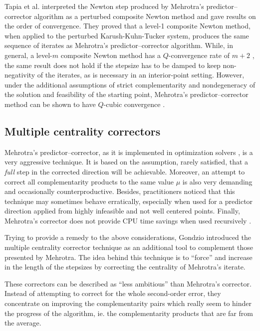 Tapia et al. \cite{TapiaZhangSaltzmanWeiser} interpreted the Newton step 
produced by Mehrotra's predictor--corrector algorithm as a perturbed
composite Newton method and gave results on the order of convergence. 
They proved that a level-1 composite Newton method, when applied 
to the perturbed Karush-Kuhn-Tucker system, produces the same 
sequence of iterates as Mehrotra's predictor--corrector algorithm. 
While, in general, a level-$m$ composite Newton method has 
a $Q$-convergence rate of $m+2$ \cite{OrtegaRheinboldt},
the same result does not hold 
if the stepsize has to be damped to keep non-negativity of the iterates, 
as is necessary in an interior-point setting. However, under 
the additional assumptions of strict complementarity and nondegeneracy 
of the solution and feasibility of the starting point, Mehrotra's 
predictor--corrector method can be shown to have $Q$-cubic convergence
\cite{TapiaZhangSaltzmanWeiser}.

%
%
\subsection{Multiple centrality correctors}
\label{sec:MultipleCC}

Mehrotra's predictor--corrector, as it is implemented in optimization 
solvers \cite{LustigMarstenShanno,Mehrotra92}, is a very aggressive 
technique. It is based on the assumption, rarely satisfied, that a 
{\it full} step in the corrected direction will be achievable.
Moreover, an attempt to correct all complementarity products to the 
same value $\mu$ is also very demanding and occasionally
counterproductive. 
Besides, practitioners noticed that this technique may sometimes 
behave erratically, especially when used for a predictor direction 
applied from highly infeasible and not well centered points. 
Finally, Mehrotra's corrector does not provide CPU time savings 
when used recursively \cite{CarpenterLustigMulveyShanno}.

Trying to provide a remedy to the above considerations, Gondzio 
\cite{Gondzio96} introduced the multiple centrality corrector technique 
as an additional tool to complement those presented by Mehrotra. 
The idea behind this technique is to ``force'' and increase in the 
length of the stepsizes by correcting the centrality of Mehrotra's 
iterate.

These correctors can be described as ``less ambitious'' than Mehrotra's
corrector. Instead of attempting to correct for the whole second-order error,
they concentrate on improving the complementarity pairs which really seem 
to hinder the progress of the algorithm, ie. the complementarity products 
that are far from the average.

